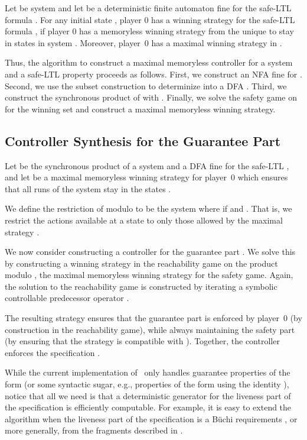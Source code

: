 \begin{theorem}\label{th:fine}
Let   be system and let  
be a deterministic finite automaton fine for the safe-LTL formula .
For any initial state , player 0
has a winning strategy for the safe-LTL formula , if
player 0 has a memoryless winning strategy from the unique  to stay in  states in system .
Moreover, player~0 has a maximal winning strategy in .
\end{theorem}



Thus, the algorithm to construct a maximal memoryless controller for a
system  and a 
safe-LTL property  proceeds as follows.
First, we construct an NFA  fine for .
Second, we use the subset construction to determinize  into
a DFA .
Third, we construct the synchronous product of  with .
Finally, we solve the safety game on  for the
winning set  and construct a maximal
memoryless winning strategy.

\subsection{Controller Synthesis for the Guarantee Part}

Let  be the synchronous product of a system and a
DFA fine for the safe-LTL , and let  be a maximal
memoryless winning strategy for player~0 which ensures that all runs of the
system stay in the states .

We define the restriction of  modulo  to be
the system  where  if
 and .
That is, we restrict the actions available at a state to only those
allowed by the maximal strategy .

We now consider constructing a controller for the guarantee part
.
We solve this by constructing a winning strategy in the reachability
game on the product  modulo , the maximal
memoryless winning strategy for the safety game.
Again, the solution to the reachability game is constructed by
iterating a symbolic controllable predecessor operator
\cite{Zielonka98,MazoDT10}.

The resulting strategy ensures that the guarantee part  is
enforced by player~0 (by construction in the reachability game), 
while always maintaining the safety part (by ensuring that the
strategy is compatible with ).
Together, the controller enforces the specification .




While the current implementation of \tool~only handles guarantee
properties of the form  (or some syntactic sugar, e.g.,
properties of the form  using the identity ), notice that all we need is
that a deterministic generator for the liveness part of the
specification is efficiently computable.
For example, it is easy to extend the algorithm when the liveness part
of the specification is a B\"uchi requirements , or
more generally, from the fragments described in \cite{AlurT04}.